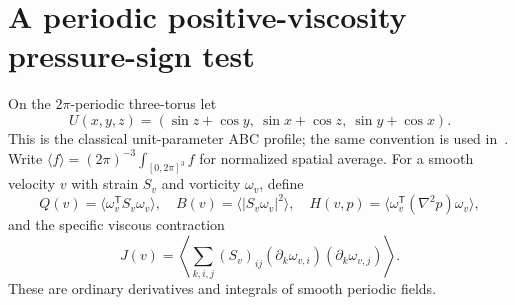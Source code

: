 \documentclass[11pt]{article}
\begin{document}
\section{A periodic positive-viscosity pressure-sign test}
On the $2\pi$-periodic three-torus let
\[
 U(x,y,z)=(\sin z+\cos y,\ \sin x+\cos z,\ \sin y+\cos x).
\]
This is the classical unit-parameter ABC profile; the same convention
is used in~\cite{XYZ}. Write $\langle f\rangle=(2\pi)^{-3}
\int_{[0,2\pi]^3}f$ for normalized spatial average. For a smooth
velocity $v$ with strain $S_v$ and vorticity $\omega_v$, define
\[
 Q(v)=\langle\omega_v^{\mathsf T}S_v\omega_v\rangle,\quad
 B(v)=\langle|S_v\omega_v|^2\rangle,\quad
 H(v,p)=\langle\omega_v^{\mathsf T}(\nabla^2p)\omega_v\rangle,
\]
and the specific viscous contraction
\[
 J(v)=\left\langle\sum_{k,i,j}(S_v)_{ij}
               (\partial_k\omega_{v,i})(\partial_k\omega_{v,j})\right\rangle.
\]
These are ordinary derivatives and integrals of smooth periodic fields.
\end{document}
